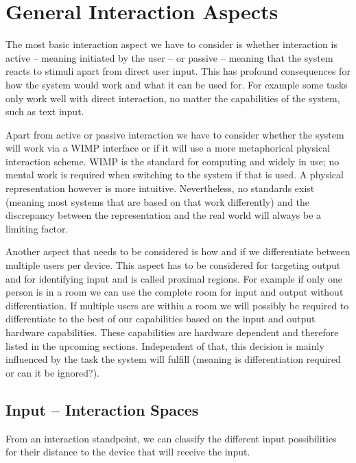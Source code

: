\section{General Interaction Aspects}

The most basic interaction aspect we have to consider is whether interaction is active – meaning initiated by the user – or passive – meaning that the system reacts to stimuli apart from direct user input.
This has profound consequences for how the system would work and what it can be used for.
For example some tasks only work well with direct interaction, no matter the capabilities of the system, such as text input.

Apart from active or passive interaction we have to consider whether the system will work via a WIMP interface or if it will use a more metaphorical physical interaction scheme.
WIMP is the standard for computing and widely in use; no mental work is required when switching to the system if that is used.
A physical representation however is more intuitive.
Nevertheless, no standards exist (meaning most systems that are based on that work differently) and the discrepancy between the representation and the real world will always be a limiting factor.

Another aspect that needs to be considered is how and if we differentiate between multiple users per device.
This aspect has to be considered for targeting output and for identifying input and is called proximal regions.
For example if only one person is in a room we can use the complete room for input and output without differentiation.
If multiple users are within a room we will possibly be required to differentiate to the best of our capabilities based on the input and output hardware capabilities.
These capabilities are hardware dependent and therefore listed in the upcoming sections.
Independent of that, this decision is mainly influenced by the task the system will fulfill (meaning is differentiation required or can it be ignored?).

\subsection{Input – Interaction Spaces}

From an interaction standpoint, we can classify the different input possibilities for their distance to the device that will receive the input.

